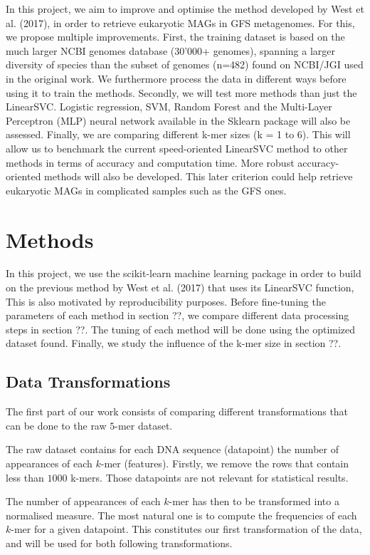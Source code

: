 \documentclass{article}
\begin{document}
\begin{multicols}{2}
		In this project, we aim to improve and optimise the method developed by West et al. (2017), in order to retrieve eukaryotic MAGs in GFS metagenomes. For this, we propose multiple improvements. First, the training dataset is based on the much larger NCBI genomes database (30’000+ genomes), spanning a larger diversity of species than the subset of genomes (n=482) found on NCBI/JGI used in the original work. We furthermore process the data in different ways before using it to train the methods. Secondly, we will test more methods than just the LinearSVC. Logistic regression, SVM, Random Forest and the Multi-Layer Perceptron (MLP) neural network available in the Sklearn package will also be assessed. Finally, we are comparing different k-mer sizes (k = 1 to 6). This will allow us to benchmark the current speed-oriented LinearSVC method to other methods in terms of accuracy and computation time. More robust accuracy-oriented methods will also be developed. This later criterion could help retrieve eukaryotic MAGs in complicated samples such as the GFS ones.
		
		\section{Methods}
		
		In this project, we use the scikit-learn machine learning package in order to build on the previous method by West et al. (2017) that uses its LinearSVC function, This is also motivated by reproducibility purposes. Before fine-tuning the parameters of each method in section ??, we compare different data processing steps in section ??. The tuning of each method will be done using the optimized dataset found. Finally, we study the influence of the k-mer size in section ??.  
		
		
		\subsection{Data Transformations}
		
		The first part of our work consists of comparing different transformations that can be done to the raw $5$-mer dataset.
		
		The raw dataset contains for each DNA sequence (datapoint) the number of appearances of each $k$-mer (features). Firstly, we remove the rows that contain less than $1000$ k-mers. Those datapoints are not relevant for statistical results.
		
		The number of appearances of each $k$-mer has then to be transformed into a normalised measure. The most natural one is to compute the frequencies of each $k$-mer for a given datapoint. This constitutes our first transformation of the data, and will be used for both following transformations.
		

\end{multicols}
\end{document}
